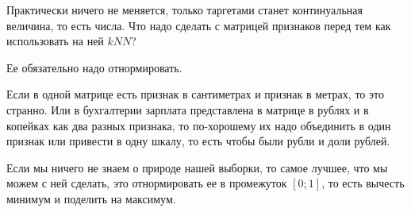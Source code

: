 Практически ничего не меняется, только таргетами станет континуальная величина, то есть числа.
Что надо сделать с матрицей признаков перед тем как использовать на ней $kNN$?

Ее обязательно надо отнормировать. 

\begin{example} Если в одной матрице есть признак в сантиметрах и признак в метрах, то это странно. Или в бухгалтерии зарплата представлена в матрице в рублях и в копейках как два разных признака, то 
по-хорошему их надо объединить в один признак или привести в одну шкалу, то есть чтобы были рубли и доли рублей. 
\end{example}

Если мы ничего не знаем о природе нашей выборки, то самое лучшее, что мы можем с ней сделать, это отнормировать ее в промежуток $[0;1]$, то есть вычесть минимум и поделить на максимум.